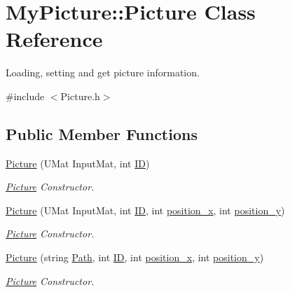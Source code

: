 \hypertarget{class_my_picture_1_1_picture}{}\section{My\+Picture\+:\+:Picture Class Reference}
\label{class_my_picture_1_1_picture}


Loading, setting and get picture information.  




{\ttfamily \#include $<$Picture.\+h$>$}

\subsection*{Public Member Functions}
\begin{DoxyCompactItemize}
\item 
\hyperlink{class_my_picture_1_1_picture_a6332cb0fe8f5762aedc0c37b8a8cf0b8}{Picture} (U\+Mat Input\+Mat, int \hyperlink{class_my_picture_1_1_picture_af5d633176718164404aa3ec4b5fb6581}{ID})
\begin{DoxyCompactList}\small\item\em \hyperlink{class_my_picture_1_1_picture}{Picture} Constructor. \end{DoxyCompactList}\item 
\hyperlink{class_my_picture_1_1_picture_af545df4aa81b67618cb99686a8d56303}{Picture} (U\+Mat Input\+Mat, int \hyperlink{class_my_picture_1_1_picture_af5d633176718164404aa3ec4b5fb6581}{ID}, int \hyperlink{group___the_ga5f9040e5635fe0db42cfcf7f2f2219a6}{position\+\_\+x}, int \hyperlink{group___the_ga86b8259886daf41584d67aca98ef9b95}{position\+\_\+y})
\begin{DoxyCompactList}\small\item\em \hyperlink{class_my_picture_1_1_picture}{Picture} Constructor. \end{DoxyCompactList}\item 
\hyperlink{class_my_picture_1_1_picture_ac614ddd06ac18734e953ce198a2dfef1}{Picture} (string \hyperlink{class_my_picture_1_1_picture_a7917ba800ec5284d496f744004c8b6ff}{Path}, int \hyperlink{class_my_picture_1_1_picture_af5d633176718164404aa3ec4b5fb6581}{ID}, int \hyperlink{group___the_ga5f9040e5635fe0db42cfcf7f2f2219a6}{position\+\_\+x}, int \hyperlink{group___the_ga86b8259886daf41584d67aca98ef9b95}{position\+\_\+y})
\begin{DoxyCompactList}\small\item\em \hyperlink{class_my_picture_1_1_picture}{Picture} Constructor. \end{DoxyCompactList}\item 

\end{DoxyCompactItemize}
